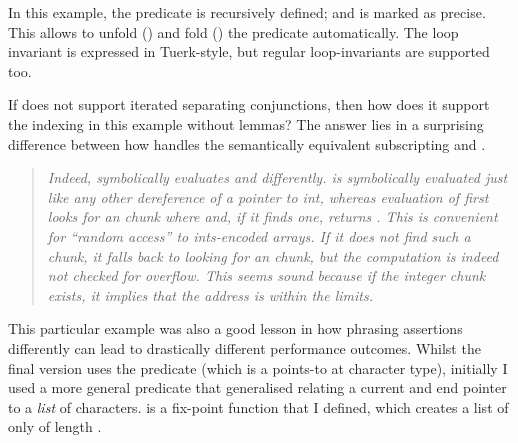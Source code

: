In this example, the  predicate is recursively
defined; and is marked as precise. This allows  to unfold
() and fold () the predicate automatically. The
loop invariant is expressed in Tuerk-style, but
regular loop-invariants are supported too.


If  does not support iterated separating conjunctions, then how
does it support the indexing in this example without lemmas? The answer lies in
a surprising difference between how  handles the semantically
equivalent subscripting  and . %

\begin{quote}
    \emph{Indeed,  symbolically evaluates  and %
     differently.  is symbolically %
    evaluated just like any other dereference of a pointer to int, whereas
    evaluation of  first looks for an
     chunk where  and, if it %
    finds one, returns . This is convenient for ``random %
    access'' to ints-encoded arrays. If it does not find such a chunk, it falls
    back to looking for an  chunk, but the %
     computation is indeed not checked for overflow. This
    seems sound because if the integer chunk exists, it implies that the
    address is within the limits.}
\end{quote}


This particular example was also a good lesson in how phrasing assertions
differently can lead to drastically different performance outcomes. Whilst the
final version uses the  predicate (which is a points-to at
character type), initially I used a more general  predicate
that generalised  relating a current and end pointer to a
\emph{list} of characters.  is a fix-point %
function that I defined, which creates a list of only  of length
.

